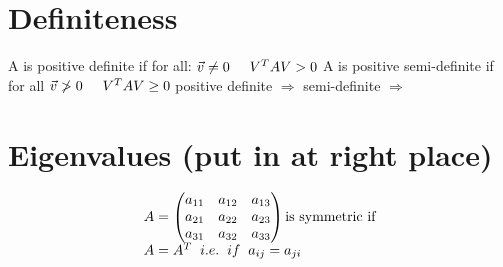 \section{Definiteness}
A is positive definite if for all: 
$\Vec{v} \neq 0 \hspace{0.5cm} V^TAV >0$
A is positive semi-definite if for all $\Vec{v} \ngtr 0 \hspace{0.5cm} V^TAV \geq 0$
positive definite $\Rightarrow$ %
semi-definite $\Rightarrow$ %


\section{Eigenvalues (put in at right place)}

\begin{equation*}
    \begin{array}{l}
      A =  
      \begin{pmatrix}
          a_{11} & a_{12} & a_{13} \\
          a_{21} & a_{22} & a_{23} \\
          a_{31} & a_{32} & a_{33}
      \end{pmatrix}
      \text{is symmetric if}\\
      A = A^T  \hspace{0.2cm} i.e. \hspace{0.2cm}if \hspace{0.2cm}a_{ij} = a_{ji}
    \end{array}
    \end{equation*}
    \vspace{10px}
    
